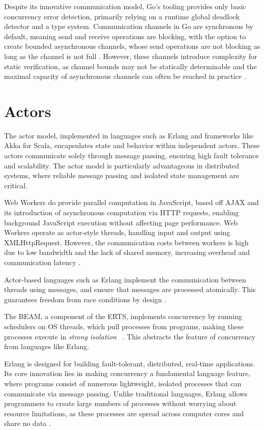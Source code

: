 \documentclass[]{final}
\begin{document}
Despite its innovative communication model, Go's tooling provides only basic
concurrency error detection, primarily relying on a runtime global deadlock
detector and a type system. Communication channels
in Go are synchronous by default, meaning send and receive operations are
blocking, with the option to create bounded asynchronous channels, whose
send operations are not blocking as long as the channel
is not full \cite{lange_empirical_2019}. However, these channels
introduce complexity for static verification, as channel bounds may not be
statically determinable and the maximal capacity of
asynchronous channels can often be reached in practice \cite{lange_empirical_2019}.

\section{Actors}
The actor model, implemented in languages such as Erlang and frameworks
like Akka for Scala, encapsulates state and behavior within independent actors.
These actors communicate solely through message passing, ensuring high fault
tolerance and scalability. The actor model is particularly advantageous in
distributed systems, where reliable message passing and isolated state
management are critical.

Web Workers do provide parallel computation in JavaScript, based off AJAX and its
introduction of asynchronous computation via HTTP requests, enabling background
JavaScript execution without affecting page performance. Web Workers operate as
actor-style threads, handling input and output using
XMLHttpRequest. However, the communication costs between workers
is high due to low bandwidth and the lack of shared memory,
increasing overhead and communication latency \cite{namiot_js_2015}.

Actor-based languages such as Erlang
implement the communication between threads
using messages, and ensure that messages are processed
atomically. This guarantees freedom from race conditions
by design \cite{bianchi_survey_2018}.

The BEAM, a component of the ERTS, implements concurrency by running schedulers
on OS threads, which pull processes from programs, making these processes execute in
\textit{strong isolation} ~\cite{stenman_erlang_2024, armstrong_making_2003, debenedetto_elixir_2019}.
This abstracts the feature of concurrency from languages like Erlang.

Erlang is designed for building fault-tolerant, distributed, real-time
applications. Its core innovation lies in making concurrency a fundamental
language feature, where programs consist of numerous lightweight,
isolated processes that can communicate via message passing.
Unlike traditional languages, Erlang allows programmers to
create large numbers of processes without worrying about resource limitations,
as these processes are spread across computer cores and share no data \cite{armstrong_erlang_2010}.
\end{document}
